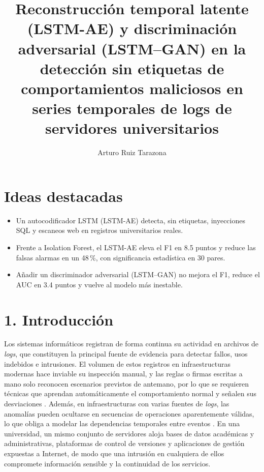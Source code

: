 \documentclass[jou,a4paper,floatsintext,donotrepeattitle]{apa7}
\title{Reconstrucción temporal latente (LSTM-AE) y discriminación adversarial (LSTM--GAN) en la detección sin etiquetas de comportamientos maliciosos en series temporales de logs de servidores universitarios}
\author{Arturo Ruiz Tarazona}
\affiliation{Facultad de Ingeniería Eléctrica y Electrónica (FIEE){,} Escuela Profesional de Ingeniería de Ciberseguridad\\
Universidad Nacional de Ingeniería (UNI){,} Lima{,} Perú}
\begin{document}
\def\keywordname{Palabras clave}\def\notelabel{Nota}
\maketitle

\section*{Ideas destacadas}
\begin{itemize}
  \item Un autocodificador LSTM (LSTM-AE) detecta, sin etiquetas, inyecciones SQL y escaneos web en registros universitarios reales.
  \item Frente a Isolation Forest, el LSTM-AE eleva el F1 en 8.5 puntos y reduce las falsas alarmas en un 48\,\%, con significancia estadística en 30 pares.
  \item Añadir un discriminador adversarial (LSTM--GAN) no mejora el F1, reduce el AUC en 3.4 puntos y vuelve al modelo más inestable.
\end{itemize}

\section{1. Introducción}
Los sistemas informáticos registran de forma continua su actividad en archivos de \textit{logs}, que constituyen la principal fuente de evidencia para detectar fallos, usos indebidos e intrusiones. El volumen de estos registros en infraestructuras modernas hace inviable su inspección manual, y las reglas o firmas escritas a mano solo reconocen escenarios previstos de antemano, por lo que se requieren técnicas que aprendan automáticamente el comportamiento normal y señalen sus desviaciones \parencite{duan2021}. Además, en infraestructuras con varias fuentes de \textit{logs}, las anomalías pueden ocultarse en secuencias de operaciones aparentemente válidas, lo que obliga a modelar las dependencias temporales entre eventos \parencite{luo2025}. En una universidad, un mismo conjunto de servidores aloja bases de datos académicas y administrativas, plataformas de control de versiones y aplicaciones de gestión expuestas a Internet, de modo que una intrusión en cualquiera de ellos compromete información sensible y la continuidad de los servicios.
\end{document}
